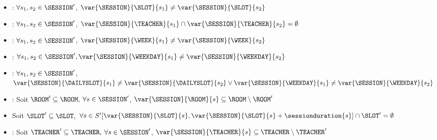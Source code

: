 \begin{itemize}
      \item \DIFFERENTSLOT :  $\forall s_1, s_2 \in \SESSION'$, $\var{\SESSION}{\SLOT}{s_1}   \ne \var{\SESSION}{\SLOT}{s_2}$
      
      \item \DIFFERENTTEACHERS :  $\forall s_1, s_2 \in \SESSION'$, $\var{\SESSION}{\TEACHER}{s_1}  \cap \var{\SESSION}{\TEACHER}{s_2} = \emptyset	$
      
      \item \DIFFERENTWEEK :  $\forall s_1, s_2 \in \SESSION'$, $\var{\SESSION}{\WEEK}{s_1}  \ne \var{\SESSION}{\WEEK}{s_2}$%
      
      \item \DIFFERENTWEEKDAY : $\forall s_1, s_2 \in \SESSION',\var{\SESSION}{\WEEKDAY}{s_1}  \ne \var{\SESSION}{\WEEKDAY}{s_2} $%
      
      \item \DIFFERENTWEEKLYSLOT :  $\forall s_1, s_2 \in \SESSION'$, $\var{\SESSION}{\DAILYSLOT}{s_1}  \ne \var{\SESSION}{\DAILYSLOT}{s_2} \vee \var{\SESSION}{\WEEKDAY}{s_1}  \ne \var{\SESSION}{\WEEKDAY}{s_2} $%
      
      \item \FORBIDDENROOMS : Soit  $\ROOM' \subseteq \ROOM,  $ $\forall s \in \SESSION'$, $\var{\SESSION}{\ROOM}{s} \subseteq \ROOM\setminus\ROOM'$
      
      \item \FORBIDDENSLOTS  Soit  $\SLOT' \subseteq \SLOT,  $
      $\forall s \in S'  [\var{\SESSION}{\SLOT}{s},\var{\SESSION}{\SLOT}{s}+\sessionduration{s}] \cap \SLOT' = \emptyset$
      
      
      \item \FORBIDDENTEACHERS : Soit  $\TEACHER' \subseteq \TEACHER,  $ $\forall s \in \SESSION'$, $\var{\SESSION}{\TEACHER}{s} \subseteq \TEACHER\setminus\TEACHER'$
      
    

\end{itemize}
